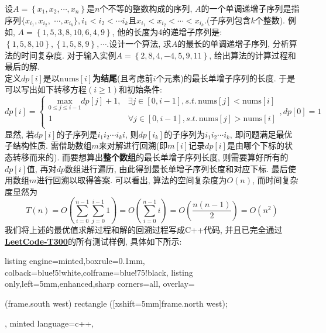\documentclass{article}
\begin{document}
\begin{homeworkProblem}
	设$A=\left\{ x_1,x_2,\cdots ,x_n \right\} $是$n$个不等的整数构成的序列, $A$的一个单调递增子序列是指序列$\{ x_{i_1},x_{i_2},$
	$\cdots ,x_{i_k} \} ,i_1<i_2<\cdots i_k	$且$x_{i_1}<x_{i_2}<\cdots <x_{i_k}$.(子序列包含$k$个整数). 例如, $A=\left\{ 1,5,3,8,10,6,4,9 \right\} $, 他的长度为4的递增子序列是: $\left\{ 1,5,8,10 \right\} ,\left\{ 1,5,8,9 \right\} ,\cdots$.设计一个算法, 求$A$的最长的单调递增子序列, 分析算法的时间复杂度. 对于输入实例$A=\left\{ 2,8,4,-4,5,9,11 \right\} $, 给出算法的计算过程和最后的解.
	\\

	\solution 定义$dp[i]$是以$\text{nums}[i]$\textbf{为结尾}(且考虑前$i$个元素)的最长单增子序列的长度. 于是可以写出如下转移方程$(i\geq 1)$和初始条件:
    $$
    dp\left[ i \right] =\left\{ \begin{matrix}
        \underset{0\le j\le i-1}{\text{max}}dp\left[ j \right] +1,&		\exists j\in \left[ 0,i-1 \right] , s.t. \,\text{nums}\left[ j \right] <\text{nums}\left[ i \right]\\
        1&		\forall j\in \left[ 0,i-1 \right] , s.t. \,\text{nums}\left[ j \right] >\text{nums}\left[ i \right]\\
    \end{matrix} \right. , dp\left[ 0 \right] =1
    $$
    显然, 若$dp[i]$的子序列是$i_1i_2\cdots i_ki$, 则$dp[i_k]$的子序列为$i_1i_2\cdots i_k$, 即问题满足最优子结构性质. 需借助数组$m$来对解进行回溯(即$m[i]$记录$dp[i]$是由哪个下标的状态转移而来的). 而要想算出\textbf{整个数组}的最长单增子序列长度, 则需要算好所有的$dp[i]$值, 再对$dp$数组进行遍历, 由此得到最长单增子序列长度和对应下标. 最后使用数组$m$进行回溯以取得答案. 可以看出, 算法的空间复杂度为$O(n)$, 而时间复杂度显然为$$T\left( n \right) =O\left( \sum_{i=0}^{n-1}{\sum_{j=0}^{i-1}{1}} \right) =O\left( \sum_{i=0}^{n-1}{i} \right) =O\left( \frac{n\left( n-1 \right)}{2} \right) =O\left( n^2 \right) 
	$$
	我们将上述的最优值求解过程和解的回溯过程写成C++代码, 并且已完全通过\href{https://leetcode.cn/problems/longest-increasing-subsequence/description/}{\textbf{LeetCode-T300}}的所有测试样例, 具体如下所示:
\begin{tcblisting}{listing engine=minted,boxrule=0.1mm,
colback=blue!5!white,colframe=blue!75!black,
listing only,left=5mm,enhanced,sharp corners=all,
overlay={\begin{tcbclipinterior} (frame.south west)
rectangle ([xshift=5mm]frame.north west);\end{tcbclipinterior}},
minted language=c++,
}
\end{tcblisting}
\end{homeworkProblem}
\end{document}
